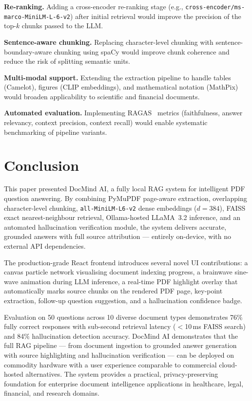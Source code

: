\documentclass[conference]{IEEEtran}
\begin{document}
\textbf{Re-ranking.}
Adding a cross-encoder re-ranking stage (e.g.,
\texttt{cross-encoder/ms-marco-MiniLM-L-6-v2}) after initial retrieval
would improve the precision of the top-$k$ chunks passed to the LLM.

\textbf{Sentence-aware chunking.}
Replacing character-level chunking with sentence-boundary-aware
chunking using spaCy would improve chunk coherence and reduce the risk
of splitting semantic units.

\textbf{Multi-modal support.}
Extending the extraction pipeline to handle tables (Camelot), figures
(CLIP embeddings), and mathematical notation (MathPix) would broaden
applicability to scientific and financial documents.

\textbf{Automated evaluation.}
Implementing RAGAS~\cite{es2023ragas} metrics (faithfulness, answer
relevancy, context precision, context recall) would enable systematic
benchmarking of pipeline variants.

\section{Conclusion}
\label{sec:conclusion}

This paper presented DocMind AI, a fully local RAG system for
intelligent PDF question answering.
By combining PyMuPDF page-aware extraction, overlapping character-level
chunking, \texttt{all-MiniLM-L6-v2} dense embeddings ($d{=}384$), FAISS
exact nearest-neighbour retrieval, Ollama-hosted LLaMA~3.2 inference,
and an automated hallucination verification module, the system delivers
accurate, grounded answers with full source attribution --- entirely
on-device, with no external API dependencies.

The production-grade React frontend introduces several novel UI
contributions: a canvas particle network visualising document indexing
progress, a brainwave sine-wave animation during LLM inference, a
real-time PDF highlight overlay that automatically marks source chunks
on the rendered PDF page, key-point extraction, follow-up question
suggestion, and a hallucination confidence badge.

Evaluation on 50 questions across 10 diverse document types demonstrates
76\% fully correct responses with sub-second retrieval latency
($<$10\,ms FAISS search) and 84\% hallucination detection accuracy.
DocMind AI demonstrates that the full RAG pipeline --- from document
ingestion to grounded answer generation with source highlighting and
hallucination verification --- can be deployed on commodity hardware
with a user experience comparable to commercial cloud-hosted
alternatives.
The system provides a practical, privacy-preserving foundation for
enterprise document intelligence applications in healthcare, legal,
financial, and research domains.
\end{document}
